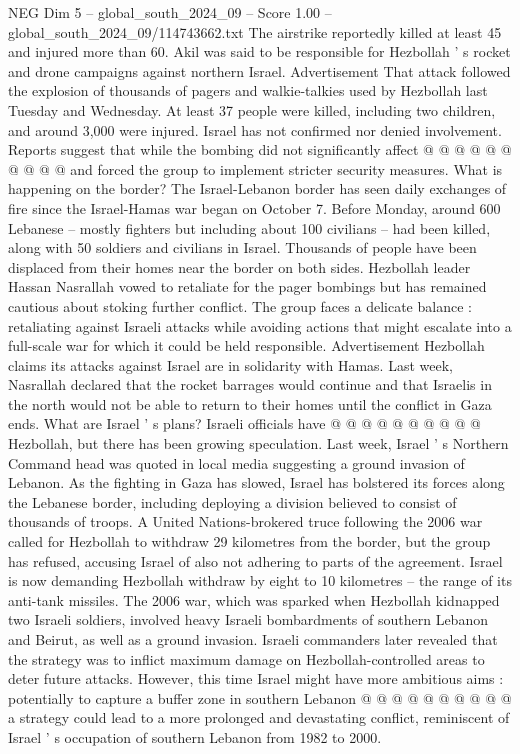 \begin{textsample}{NEG Dim 5 – global\_south\_2024\_09 – Score 1.00 – global\_south\_2024\_09/114743662.txt}
The airstrike reportedly killed at least 45 and injured more than 60.
Akil was said to be responsible for Hezbollah ' s rocket and drone campaigns against northern Israel.
Advertisement That attack followed the explosion of thousands of pagers and walkie-talkies used by Hezbollah last Tuesday and Wednesday.
At least 37 people were killed, including two children, and around 3,000 were injured.
Israel has not confirmed nor denied involvement.
Reports suggest that while the bombing did not significantly affect @ @ @ @ @ @ @ @ @ @ and forced the group to implement stricter security measures.
What is happening on the border?
The Israel-Lebanon border has seen daily exchanges of fire since the Israel-Hamas war began on October 7.
Before Monday, around 600 Lebanese -- mostly fighters but including about 100 civilians -- had been killed, along with 50 soldiers and civilians in Israel.
Thousands of people have been displaced from their homes near the border on both sides.
Hezbollah leader Hassan Nasrallah vowed to retaliate for the pager bombings but has remained cautious about stoking further conflict.
The group faces a delicate balance : retaliating against Israeli attacks while avoiding actions that might escalate into a full-scale war for which it could be held responsible.
Advertisement Hezbollah claims its attacks against Israel are in solidarity with Hamas.
Last week, Nasrallah declared that the rocket barrages would continue and that Israelis in the north would not be able to return to their homes until the conflict in Gaza ends.
What are Israel ' s plans?
Israeli officials have @ @ @ @ @ @ @ @ @ @ Hezbollah, but there has been growing speculation.
Last week, Israel ' s Northern Command head was quoted in local media suggesting a ground invasion of Lebanon.
As the fighting in Gaza has slowed, Israel has bolstered its forces along the Lebanese border, including deploying a division believed to consist of thousands of troops.
A United Nations-brokered truce following the 2006 war called for Hezbollah to withdraw 29 kilometres from the border, but the group has refused, accusing Israel of also not adhering to parts of the agreement.
Israel is now demanding Hezbollah withdraw by eight to 10 kilometres -- the range of its anti-tank missiles.
The 2006 war, which was sparked when Hezbollah kidnapped two Israeli soldiers, involved heavy Israeli bombardments of southern Lebanon and Beirut, as well as a ground invasion.
Israeli commanders later revealed that the strategy was to inflict maximum damage on Hezbollah-controlled areas to deter future attacks.
However, this time Israel might have more ambitious aims : potentially to capture a buffer zone in southern Lebanon @ @ @ @ @ @ @ @ @ @ a strategy could lead to a more prolonged and devastating conflict, reminiscent of Israel ' s occupation of southern Lebanon from 1982 to 2000.

\end{textsample}
